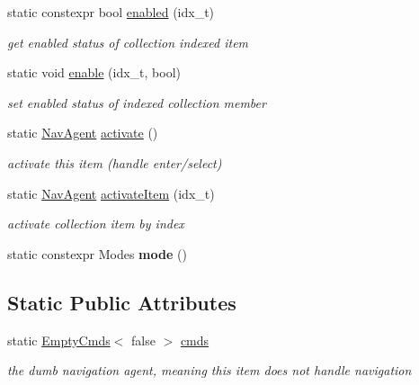 \begin{DoxyCompactItemize}
static constexpr bool \hyperlink{structEmpty_adc2d105531fb7b43f60fcd9deaaaa71c}{enabled} (idx\+\_\+t)
\begin{DoxyCompactList}\small\item\em get enabled status of collection indexed item \end{DoxyCompactList}\item 
\mbox{\label{structEmpty_af4997efbad97edae86108c77b4b0f26a}} 
static void \hyperlink{structEmpty_af4997efbad97edae86108c77b4b0f26a}{enable} (idx\+\_\+t, bool)
\begin{DoxyCompactList}\small\item\em set enabled status of indexed collection member \end{DoxyCompactList}\item 
static \hyperlink{structNavAgent}{Nav\+Agent} \hyperlink{structEmpty_ade3cccf531dad6fe907c3a9764204e1c}{activate} ()
\begin{DoxyCompactList}\small\item\em activate this item (handle enter/select) \end{DoxyCompactList}\item 
\mbox{\label{structEmpty_a2f4d5ca0c3193ed070ef49c4dcc9eb5c}} 
static \hyperlink{structNavAgent}{Nav\+Agent} \hyperlink{structEmpty_a2f4d5ca0c3193ed070ef49c4dcc9eb5c}{activate\+Item} (idx\+\_\+t)
\begin{DoxyCompactList}\small\item\em activate collection item by index \end{DoxyCompactList}\item 
\mbox{\label{structEmpty_a8b3d397b1910943820e6bf56c3a6bf5d}} 
static constexpr Modes {\bfseries mode} ()
\end{DoxyCompactItemize}
\subsection*{Static Public Attributes}
\begin{DoxyCompactItemize}
\item 
\mbox{\label{structEmpty_a17b77b2cc02c543127f2db455344f2d3}} 
static \hyperlink{structEmptyCmds}{Empty\+Cmds}$<$ false $>$ \hyperlink{structEmpty_a17b77b2cc02c543127f2db455344f2d3}{cmds}
\begin{DoxyCompactList}\small\item\em the dumb navigation agent, meaning this item does not handle navigation \end{DoxyCompactList}\end{DoxyCompactItemize}


